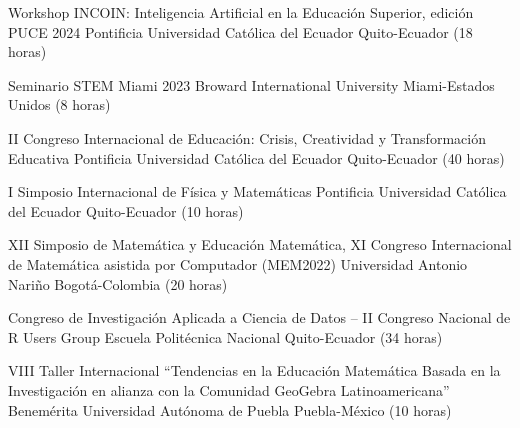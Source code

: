 \documentclass[
	a4paper,
	maincolor=cvblue!70!blue,
	sidecolor=gray!30,
	sectioncolor=cvblue!70!blue,
    sidebarwidth=7.5cm,
	topbottommargin=20pt,
	leftrightmargin=20pt,
]{fortysecondscv}
\begin{document}
    

    
    

    
    {Workshop INCOIN: Inteligencia Artificial en la Educación Superior, edición PUCE 2024}
    {Pontificia Universidad Católica del Ecuador}
    {Quito-Ecuador (18 horas)}
    
    {Seminario STEM Miami 2023}
    {Broward International University}
    {Miami-Estados Unidos (8 horas)}

    {II Congreso Internacional de Educación: Crisis, Creatividad y Transformación Educativa}
    {Pontificia Universidad Católica del Ecuador}
    {Quito-Ecuador (40 horas)}

    {I Simposio Internacional de Física y Matemáticas}
    {Pontificia Universidad Católica del Ecuador}
    {Quito-Ecuador (10 horas)}

    {XII Simposio de Matemática y Educación Matemática, XI Congreso Internacional de Matemática asistida por Computador (MEM2022)}
    {Universidad Antonio Nariño}
    {Bogotá-Colombia (20 horas)}

    {Congreso de Investigación Aplicada a Ciencia de Datos – II Congreso Nacional de R Users Group}
    {Escuela Politécnica Nacional}
    {Quito-Ecuador (34 horas)}

    {VIII Taller Internacional “Tendencias en la Educación Matemática Basada en la Investigación en alianza con la Comunidad GeoGebra Latinoamericana”}
    {Benemérita Universidad Autónoma de Puebla}
    {Puebla-México (10 horas)}

\end{document}
